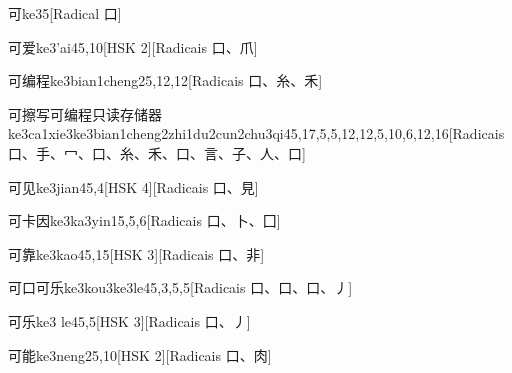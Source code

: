 \begin{entry}{可}{ke3}{5}[Radical ⼝]
\end{entry}

\begin{entry}{可爱}{ke3'ai4}{5,10}[HSK 2][Radicais ⼝、⽖]
\end{entry}

\begin{entry}{可编程}{ke3bian1cheng2}{5,12,12}[Radicais ⼝、⽷、⽲]
\end{entry}

\begin{entry*}{可擦写可编程只读存储器}{ke3ca1xie3ke3bian1cheng2zhi1du2cun2chu3qi4}{5,17,5,5,12,12,5,10,6,12,16}[Radicais ⼝、⼿、⼍、⼝、⽷、⽲、⼝、⾔、⼦、⼈、⼝]
\end{entry*}

\begin{entry}{可见}{ke3jian4}{5,4}[HSK 4][Radicais ⼝、⾒]
\end{entry}

\begin{entry}{可卡因}{ke3ka3yin1}{5,5,6}[Radicais ⼝、⼘、⼞]
\end{entry}

\begin{entry}{可靠}{ke3kao4}{5,15}[HSK 3][Radicais ⼝、⾮]
\end{entry}

\begin{entry}{可口可乐}{ke3kou3ke3le4}{5,3,5,5}[Radicais ⼝、⼝、⼝、⼃]
\end{entry}

\begin{entry}{可乐}{ke3 le4}{5,5}[HSK 3][Radicais ⼝、⼃]
\end{entry}

\begin{entry}{可能}{ke3neng2}{5,10}[HSK 2][Radicais ⼝、⾁]
\end{entry}

